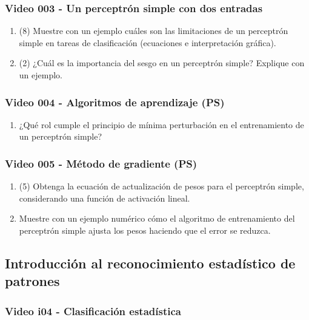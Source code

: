 \documentclass[a4paper,10pt,spanish,oneside]{article}
\begin{document}
\subsubsection{Video 003 - Un perceptrón simple con dos entradas}

\begin{enumerate}
\item (8) Muestre con un ejemplo cuáles son las limitaciones de un perceptrón simple en tareas de clasificación (ecuaciones e interpretación gráfica).

\item (2) ¿Cuál es la importancia del sesgo en un perceptrón simple? Explique con un ejemplo.
\end{enumerate}

\subsubsection{Video 004 - Algoritmos de aprendizaje (PS)}

\begin{enumerate}
\item ¿Qué rol cumple el principio de mínima perturbación en el entrenamiento de un perceptrón simple?
\end{enumerate}

\subsubsection{Video 005 - Método de gradiente (PS)}

\begin{enumerate}
\item (5) Obtenga la ecuación de actualización de pesos para el perceptrón simple, considerando una función de activación lineal.

\item Muestre con un ejemplo numérico cómo el algoritmo de entrenamiento del perceptrón simple ajusta los pesos haciendo que el error se reduzca.
\end{enumerate}

\subsection{Introducción al reconocimiento estadístico de patrones}

\subsubsection{Video i04 - Clasificación estadística}
\end{document}
